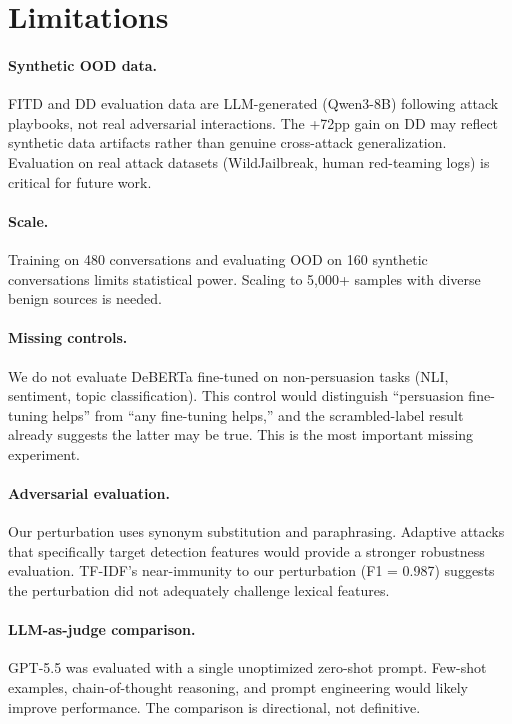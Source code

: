 \documentclass[11pt]{article}
\begin{document}
\section{Limitations}
\label{sec:limitations}

\paragraph{Synthetic OOD data.}
FITD and DD evaluation data are LLM-generated (Qwen3-8B) following attack playbooks, not real adversarial interactions. The +72pp gain on DD may reflect synthetic data artifacts rather than genuine cross-attack generalization. Evaluation on real attack datasets (WildJailbreak, human red-teaming logs) is critical for future work.

\paragraph{Scale.}
Training on 480 conversations and evaluating OOD on 160 synthetic conversations limits statistical power. Scaling to 5,000+ samples with diverse benign sources is needed.

\paragraph{Missing controls.}
We do not evaluate DeBERTa fine-tuned on non-persuasion tasks (NLI, sentiment, topic classification). This control would distinguish ``persuasion fine-tuning helps'' from ``any fine-tuning helps,'' and the scrambled-label result already suggests the latter may be true. This is the most important missing experiment.

\paragraph{Adversarial evaluation.}
Our perturbation uses synonym substitution and paraphrasing. Adaptive attacks \citep{nasr2025adaptive} that specifically target detection features would provide a stronger robustness evaluation. TF-IDF's near-immunity to our perturbation (F1 = 0.987) suggests the perturbation did not adequately challenge lexical features.

\paragraph{LLM-as-judge comparison.}
GPT-5.5 was evaluated with a single unoptimized zero-shot prompt. Few-shot examples, chain-of-thought reasoning, and prompt engineering would likely improve performance. The comparison is directional, not definitive.
\end{document}

